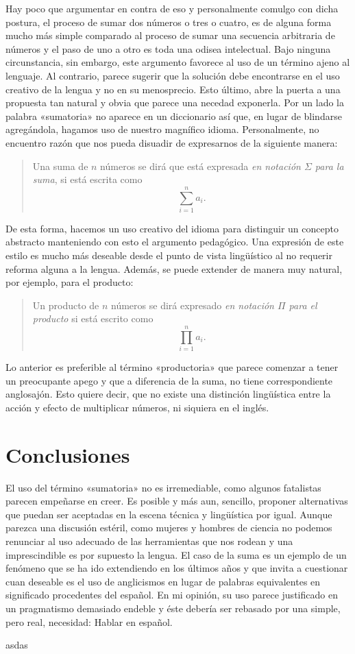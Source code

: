 \documentclass[draft,letter,10pt,notitlepage]{article}
\theoremstyle{definition}
\theoremstyle{remark}
\begin{document}
Hay poco que argumentar en contra de eso y personalmente comulgo con
dicha postura, el proceso de sumar dos números o tres o cuatro, es
de alguna forma mucho más simple comparado al proceso de sumar una 
secuencia arbitraria de números y el paso de uno a otro es toda una odisea
intelectual. Bajo ninguna circunstancia, sin embargo, este argumento favorece
al uso de un término ajeno al lenguaje. Al contrario, parece
sugerir que la solución debe encontrarse en el uso creativo
de la lengua y no en su menosprecio.
Esto último, abre la puerta a una propuesta tan
natural y obvia que parece una necedad exponerla. Por
un lado la palabra «sumatoria» no aparece en un diccionario así que,
en lugar de blindarse agregándola, hagamos uso de nuestro magnífico
idioma. Personalmente, no encuentro razón que nos pueda disuadir de 
expresarnos de la siguiente manera:
\begin{quote}
  Una suma de \( n\) números se dirá que está expresada \emph{en notación
  \( \Sigma\) para la suma}, si está escrita como  \[\sum_{i=1}^n a_i.\]
\end{quote}
De esta forma, hacemos un uso creativo del idioma para distinguir
un concepto abstracto manteniendo con esto el argumento pedagógico.
Una expresión de este estilo es mucho más deseable desde el punto
de vista lingüístico al no requerir reforma alguna a la lengua.
Además, se puede extender de manera muy natural, por ejemplo,
para el producto:
\begin{quote}
  Un producto de \( n\) números se dirá expresado  \emph{en notación
  \( \Pi\) para el producto} si está escrito como
  \[ \prod_{i=1}^n a_i.\]
\end{quote}
Lo anterior es preferible al término «productoria» que parece comenzar
a tener un preocupante apego y que a diferencia de la suma, no tiene
correspondiente anglosajón. Esto quiere decir, que no existe una distinción
lingüística entre la acción y efecto de multiplicar números, ni
siquiera en el inglés.

\section{Conclusiones}
El uso del término «sumatoria» no es irremediable, como algunos
fatalistas parecen empeñarse en creer. Es posible y más aun, sencillo,
proponer alternativas que puedan ser aceptadas en la escena técnica y
lingüística por igual. Aunque parezca una discusión estéril, como
mujeres y hombres de ciencia no podemos renunciar al uso adecuado de
las herramientas que nos rodean y una imprescindible es por supuesto
la lengua. El caso de la suma es un ejemplo de un fenómeno que se ha
ido extendiendo en los últimos años y que invita a cuestionar cuan
deseable es el uso de anglicismos en lugar de palabras equivalentes
en significado procedentes del español. En mi opinión, su uso parece
justificado en un pragmatismo demasiado endeble y éste debería ser
rebasado por una simple, pero real, necesidad: Hablar en español.

\begin{thebibliography}{}

   asdas 

\end{thebibliography}
\end{document}
